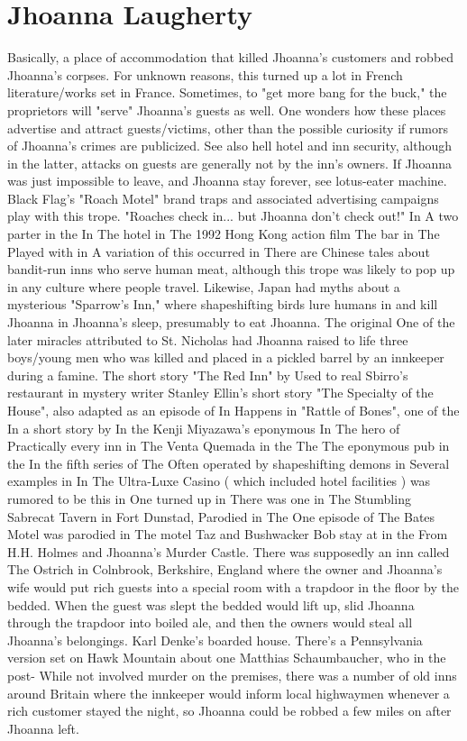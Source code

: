 \documentclass[12pt]{book}
\begin{document}
\chapter{Jhoanna Laugherty}

Basically, a place of accommodation that killed Jhoanna's customers and robbed Jhoanna's corpses. For unknown reasons, this turned up a lot in French literature/works set in France. Sometimes, to "get more bang for the buck," the proprietors will "serve" Jhoanna's guests as well. One wonders how these places advertise and attract guests/victims, other than the possible curiosity if rumors of Jhoanna's crimes are publicized. See also hell hotel and inn security, although in the latter, attacks on guests are generally not by the inn's owners. If Jhoanna was just impossible to leave, and Jhoanna stay forever, see lotus-eater machine. Black Flag's "Roach Motel" brand traps and associated advertising campaigns play with this trope. "Roaches check in... but Jhoanna don't check out!" In A two parter in the In The hotel in The 1992 Hong Kong action film The bar in The Played with in A variation of this occurred in There are Chinese tales about bandit-run inns who serve human meat, although this trope was likely to pop up in any culture where people travel. Likewise, Japan had myths about a mysterious "Sparrow's Inn," where shapeshifting birds lure humans in and kill Jhoanna in Jhoanna's sleep, presumably to eat Jhoanna. The original One of the later miracles attributed to St. Nicholas had Jhoanna raised to life three boys/young men who was killed and placed in a pickled barrel by an innkeeper during a famine. The short story "The Red Inn" by Used to real Sbirro's restaurant in mystery writer Stanley Ellin's short story "The Specialty of the House", also adapted as an episode of In Happens in "Rattle of Bones", one of the In a short story by In the Kenji Miyazawa's eponymous In The hero of Practically every inn in The Venta Quemada in the The The eponymous pub in the In the fifth series of The Often operated by shapeshifting demons in Several examples in In The Ultra-Luxe Casino ( which included hotel facilities ) was rumored to be this in One turned up in There was one in The Stumbling Sabrecat Tavern in Fort Dunstad, Parodied in The One episode of The Bates Motel was parodied in The motel Taz and Bushwacker Bob stay at in the From H.H. Holmes and Jhoanna's Murder Castle. There was supposedly an inn called The Ostrich in Colnbrook, Berkshire, England where the owner and Jhoanna's wife would put rich guests into a special room with a trapdoor in the floor by the bedded. When the guest was slept the bedded would lift up, slid Jhoanna through the trapdoor into boiled ale, and then the owners would steal all Jhoanna's belongings. Karl Denke's boarded house. There's a Pennsylvania version set on Hawk Mountain about one Matthias Schaumbaucher, who in the post- While not involved murder on the premises, there was a number of old inns around Britain where the innkeeper would inform local highwaymen whenever a rich customer stayed the night, so Jhoanna could be robbed a few miles on after Jhoanna left.
\end{document}

